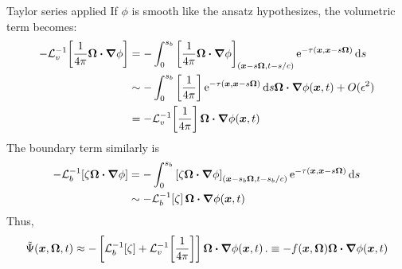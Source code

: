 \documentclass{beamer}
\begin{document}
\begin{frame}{Taylor series applied}
  If $\phi$ is smooth like the ansatz hypothesizes, the volumetric term becomes:
  \begin{align} \nonumber
  -\mathcal{L}_{v}^{-1}\!\left[ \frac{1}{4\pi} \bm{\Omega}\bm{\cdot} \bm{\nabla} \phi \right]
  &= -\int_{0}^{s_b}
    \left[ \frac{1}{4\pi} \bm{\Omega}\bm{\cdot} \bm{\nabla} \phi \right]_{(\bm{x} - s
    \bm{\Omega}, t-s/c)}
    \mathop{}\!\mathrm{e}^{ -\tau(\bm{x}, \bm{x} - s \bm{\Omega})}
    \mathop{}\!\mathrm{d} s
  \\\nonumber
  &\sim - \int_{0}^{s_b}
    \left[ \frac1{4\pi}\right]
    \mathop{}\!\mathrm{e}^{ -\tau(\bm{x}, \bm{x} - s \bm{\Omega})} \mathop{}\!\mathrm{d} s
    \bm{\Omega}\bm{\cdot} \bm{\nabla} \phi(\bm{x},t) + O(\epsilon^2)
  \\\label{eq:tildeS}
  &= - \mathcal{L}_{v}^{-1}\!\left[ \frac1{4\pi} \right] \bm{\Omega}\bm{\cdot} \bm{\nabla} \phi(\bm{x},t)
  \end{align}
  The boundary term similarly is
  \begin{align} \nonumber
  - \mathcal{L}_{b}^{-1}\!\left[ \zeta \bm{\Omega}\bm{\cdot} \bm{\nabla} \phi \right]
  &= -\int_{0}^{s_b}
    \left[\zeta \bm{\Omega}\bm{\cdot} \bm{\nabla} \phi \right]_{(\bm{x} - s_b
    \bm{\Omega}, t-s_b/c)}
    \mathop{}\!\mathrm{e}^{ -\tau(\bm{x}, \bm{x} - s \bm{\Omega})}
    \mathop{}\!\mathrm{d} s
  \\ \label{eq:tildeB}
  &\sim - \mathcal{L}_{b}^{-1}\!\left[ \zeta \right]
  \bm{\Omega}\bm{\cdot} \bm{\nabla} \phi(\bm{x},t)
  \end{align}
  Thus,
  \begin{equation}\label{eq:capPsiApprox}
    \tilde\Psi(\bm{x}, \bm{\Omega}, t) \approx
    - \left[ \mathcal{L}_{b}^{-1}\!\left[ \zeta \right]
    + \mathcal{L}_{v}^{-1}\!\left[ \frac1{4\pi} \right] \right]
    \bm{\Omega}\bm{\cdot} \bm{\nabla} \phi(\bm{x},t)\,.
    \equiv -f(\bm{x}, \bm{\Omega}) \bm{\Omega}\bm{\cdot} \bm{\nabla} \phi(\bm{x},t)
  \end{equation}
\end{frame}
\end{document}
